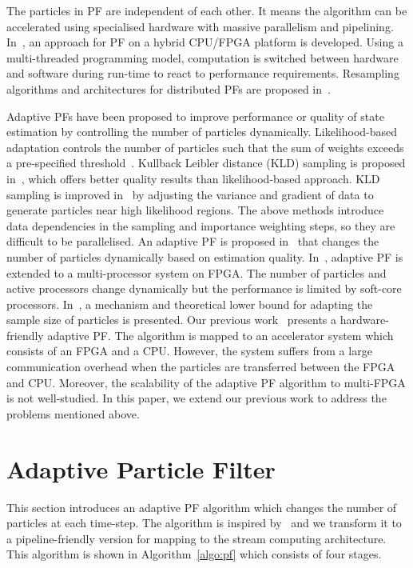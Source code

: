 The particles in PF are independent of each other.
It means the algorithm can be accelerated using specialised hardware with massive parallelism and pipelining.
In~\cite{happe11}, an approach for PF on a hybrid CPU/FPGA platform is developed.
Using a multi-threaded programming model, computation is switched between hardware and software during run-time to react to performance requirements. 
Resampling algorithms and architectures for distributed PFs are proposed in~\cite{bolic05}.

Adaptive PFs have been proposed to improve performance or quality of state estimation by controlling the number of particles dynamically. 
Likelihood-based adaptation controls the number of particles such that the sum of weights exceeds a pre-specified threshold~\cite{koller98}.
Kullback Leibler distance (KLD) sampling is proposed in~\cite{fox03}, which offers better quality results than likelihood-based approach. 
KLD sampling is improved in~\cite{park10} by adjusting the variance and gradient of data to generate particles near high likelihood regions. 
The above methods introduce data dependencies in the sampling and importance weighting steps, so they are difficult to be parallelised. 
An adaptive PF is proposed in~\cite{bolic02} that changes the number of particles dynamically based on estimation quality. 
In~\cite{chau12}, adaptive PF is extended to a multi-processor system on FPGA.
The number of particles and active processors change dynamically but the performance is limited by soft-core processors.
In~\cite{liu07}, a mechanism and theoretical lower bound for adapting the sample size of particles is presented.
Our previous work~\cite{chau13a} presents a hardware-friendly adaptive PF. 
The algorithm is mapped to an accelerator system which consists of an FPGA and a CPU.
However, the system suffers from a large communication overhead when the particles are transferred between the FPGA and CPU.
Moreover, the scalability of the adaptive PF algorithm to multi-FPGA is not well-studied.
In this paper, we extend our previous work to address the problems mentioned above.

\section{Adaptive Particle Filter}
\label{sec:apf}

This section introduces an adaptive PF algorithm which changes the number of particles at each time-step.
The algorithm is inspired by~\cite{liu07} and we transform it to a pipeline-friendly version for mapping to the stream computing architecture.
This algorithm is shown in Algorithm~\ref{algo:pf} which consists of four stages.

